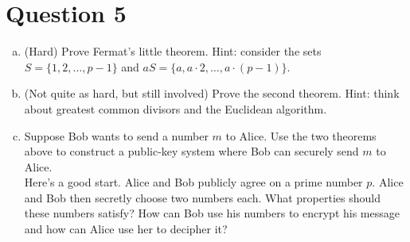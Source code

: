 \documentclass[12pt]{article}
\begin{document}
\section*{Question 5}
\begin{enumerate}[(a)]
	\item (Hard) Prove Fermat's little theorem. Hint: consider the sets \\$S = \{1, 2, \ldots, p-1\}$ and $aS = \{a, a\cdot 2, \ldots, a\cdot (p-1)\}$.

	\vspace{4cm}

	\item (Not quite as hard, but still involved) Prove the second theorem. Hint: think about greatest common divisors and the Euclidean algorithm.

	\vspace{4cm}

	\item Suppose Bob wants to send a number $m$ to Alice. Use the two theorems above to construct a public-key system where Bob can securely send $m$ to Alice.\\

	\noindent Here's a good start. Alice and Bob publicly agree on a prime number $p$. Alice and Bob then secretly choose two numbers each. What properties should these numbers satisfy? How can Bob use his numbers to encrypt his message and how can Alice use her to decipher it?
\end{enumerate}







\end{document}
